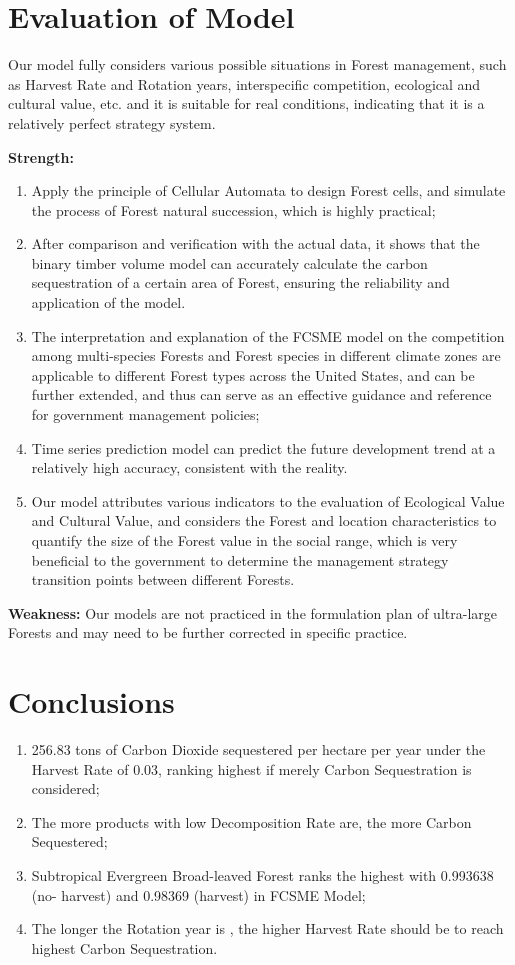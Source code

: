 \documentclass{mcmthesis}
\numberwithin{figure}{section}
\numberwithin{table}{section}
\numberwithin{equation}{section}
\begin{document}
\section{Evaluation of Model}
Our model fully considers various possible situations in Forest management, 
such as Harvest Rate and Rotation years, interspecific competition, ecological 
and cultural value, etc. and it is suitable for real conditions, indicating 
that it is a relatively perfect strategy system.

\textbf{Strength:}
\begin{enumerate}
  \item Apply the principle of Cellular Automata to design Forest cells, 
  and simulate the process of Forest natural succession, which is highly 
  practical;
  \item After comparison and verification with the actual data, it shows that the binary timber volume model can accurately calculate the carbon sequestration of a certain area of Forest, ensuring the reliability and application of the model.
  \item The interpretation and explanation of the FCSME model on the competition among multi-species Forests and Forest species in different climate zones are applicable to different Forest types across the United States, and can be further extended, and thus can serve as an effective guidance and reference for government management policies;
  \item Time series prediction model can predict the future development trend at a relatively high accuracy, consistent with the reality.
  \item Our model attributes various indicators to the evaluation of Ecological Value and Cultural Value, and considers the Forest and location characteristics to quantify the size of the Forest value in the social range, which is very beneficial to the government to determine the management strategy transition points between different Forests.


\end{enumerate}

\textbf{Weakness:}
Our models are not practiced in the formulation plan of ultra-large Forests 
and may need to be further corrected in specific practice.


\section{Conclusions}
\begin{enumerate}
  \item 256.83 tons of Carbon Dioxide sequestered per hectare per year under 
  the Harvest Rate of 0.03, ranking highest if merely Carbon Sequestration 
  is considered;
  \item The more products with low Decomposition Rate are, the more Carbon Sequestered;
  \item Subtropical Evergreen Broad-leaved Forest ranks the highest with 0.993638 (no-
  harvest) and 0.98369 (harvest) in FCSME Model;
  \item The longer the Rotation year is , the higher Harvest Rate should be to reach highest Carbon Sequestration.
\end{enumerate}
\end{document}
